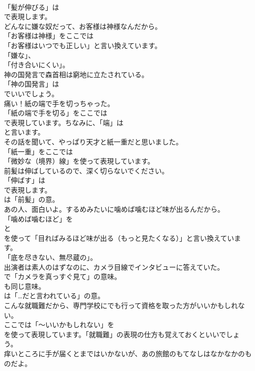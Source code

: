 \documentclass[8pt]{extreport}
\begin{document}
\begin{CJK}{UTF8}{min}
\\	「髪が伸びる」は
\\	で表現します。	
\\	どんなに嫌な奴だって、お客様は神様なんだから。 
\\	「お客様は神様」をここでは
\\	「お客様はいつでも正しい」と言い換えています。
\\	「嫌な」、
\\	「付き合いにくい」。	
\\	神の国発言で森首相は窮地に立たされている。 
\\	「神の国発言」は
\\	でいいでしょう。	
\\	痛い！紙の端で手を切っちゃった。 
\\	「紙の端で手を切る」をここでは
\\	で表現しています。ちなみに、「端」は
\\	と言います。	
\\	その話を聞いて、やっぱり天才と紙一重だと思いました。 
\\	「紙一重」をここでは
\\	「微妙な（境界）線」を使って表現しています。	
\\	前髪は伸ばしているので、深く切らないでください。 
\\	「伸ばす」は 
\\	で表現します。
\\	は「前髪」の意。	
\\	あの人、面白いよ。するめみたいに噛めば噛むほど味が出るんだから。 
\\	「噛めば噛むほど」を
\\	と
\\	を使って「目ればみるほど味が出る（もっと見たくなる）」と言い換えています。
\\	「底を尽きない、無尽蔵の」。	
\\	出演者は素人のはずなのに、カメラ目線でインタビューに答えていた。 
\\	で「カメラを真っすぐ見て」の意味。
\\	も同じ意味。
\\	は「…だと言われている」の意。	
\\	こんな就職難だから、専門学校にでも行って資格を取った方がいいかもしれない。 
\\	ここでは「～いいかもしれない」を
\\	を使って表現しています。「就職難」の表現の仕方も覚えておくといいでしょう。	
\\	痒いところに手が届くとまではいかないが、あの旅館のもてなしはなかなかのものだよ。 

\end{CJK}
\end{document}
